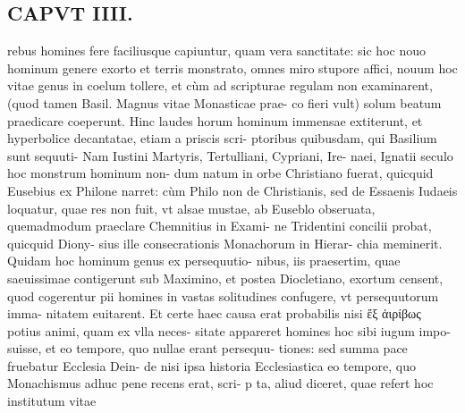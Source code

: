 \documentclass{article}
\begin{document}
\begin{pages}
\section*{CAPVT  IIII. }
\marginpar{[ p.215 ]}\pstart rebus homines fere faciliusque capiuntur, quam vera sanctitate: sic hoc nouo hominum genere exorto et terris monstrato, omnes miro stupore affici, nouum hoc vitae genus in coelum tollere, et cùm ad scripturae regulam non examinarent, (quod tamen Basil. Magnus vitae Monasticae prae- co fieri vult) solum beatum praedicare coeperunt. Hinc laudes horum hominum immensae extiterunt, et hyperbolice decantatae, etiam a priscis scri- ptoribus quibusdam, qui Basilium sunt sequuti- Nam Iustini Martyris, Tertulliani, Cypriani, Ire- naei, Ignatii seculo hoc monstrum hominum non- dum natum in orbe Christiano fuerat, quicquid Eusebius ex Philone narret: cùm Philo non de Christianis, sed de Essaenis Iudaeis loquatur, quae res non fuit, vt alsae mustae, ab Euseblo obseruata, quemadmodum praeclare Chemnitius in Exami- ne Tridentini concilii probat, quicquid Diony- sius ille consecrationis Monachorum in Hierar- chia meminerit.  \pend\pstart Quidam hoc hominum genus ex persequutio- nibus, iis praesertim, quae saeuissimae contigerunt sub Maximino, et postea Diocletiano, exortum censent, quod cogerentur pii homines in vastas solitudines confugere, vt persequutorum imma- nitatem euitarent. Et certe haec causa erat probabilis nisi ἔξ ἀιρίβως potius animi, quam ex vlla neces- sitate appareret homines hoc sibi iugum impo- suisse, et eo tempore, quo nullae erant persequu- tiones: sed summa pace fruebatur Ecclesia Dein- de nisi ipsa historia Ecclesiastica eo tempore, quo Monachismus adhuc pene recens erat, scri- p ta, aliud diceret, quae refert hoc institutum vitae  \pend

\end{pages}
\end{document}
